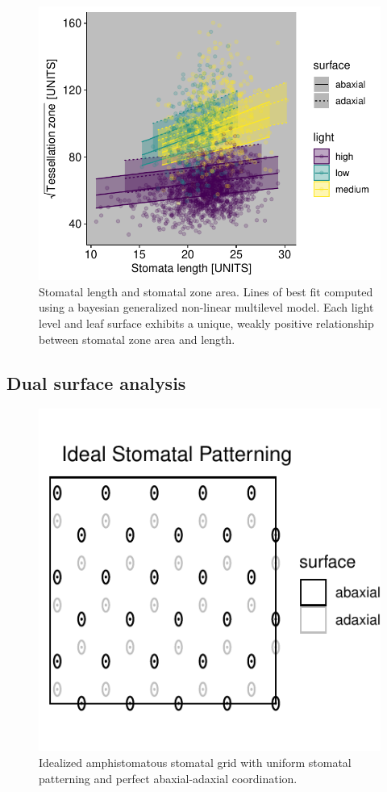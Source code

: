 \documentclass[12pt,halfline,a4paper,]{ouparticle}
\begin{document}
\begin{figure}[ht]
\includegraphics[width = \textwidth]{figures/length-area.pdf}
\caption{Stomatal length and stomatal zone area. Lines of best fit computed using a bayesian generalized non-linear multilevel model. Each light level and leaf surface exhibits a unique, weakly positive relationship between stomatal zone area and length.}
\label{fig:length-area}
\end{figure}

\hypertarget{dual-surface-analysis-1}{%
\subsection{Dual surface analysis}\label{dual-surface-analysis-1}}

\begin{figure}[ht]
\includegraphics[width = \textwidth]{figures/ideal-amphi-grid.pdf}
\caption{Idealized amphistomatous stomatal grid with uniform stomatal patterning and perfect abaxial-adaxial coordination.}
\label{fig:amphi}
\end{figure}
\end{document}
